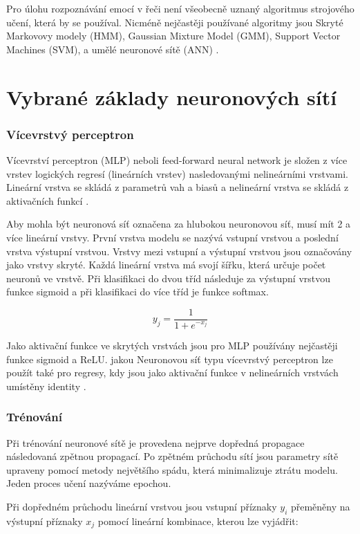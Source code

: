 \documentclass[FM,BP]{tulthesis}
\begin{document}
Pro úlohu rozpoznávání emocí v řeči není všeobecně uznaný algoritmus strojového učení, která by se používal. Nicméně nejčastěji používané algoritmy jsou Skryté Markovovy modely (HMM), Gaussian Mixture Model (GMM), Support Vector Machines (SVM), a umělé neuronové sítě (ANN) \cite{DBLP:journals/speech/AkcayO20}.

\chapter{Vybrané základy neuronových sítí}

\subsection{Vícevrstvý perceptron}
Vícevrství perceptron (MLP) neboli feed-forward neural network je složen z více vrstev logických regresí (lineárních vrstev) nasledovanými nelineárními vrstvami. Lineární vrstva se skládá z parametrů vah a biasů a nelineární vrstva se skládá z aktivačních funkcí \cite{DBLP:books/lib/Bishop07}.

Aby mohla být neuronová síť označena za hlubokou neuronovou síť, musí mít 2 a více lineární vrstvy. První vrstva modelu se nazývá vstupní vrstvou a poslední vrstva výstupní vrstvou. Vrstvy mezi vstupní a výstupní vrstvou jsou označovány jako vrstvy skryté. Každá lineární vrstva má svojí šířku, která určuje počet neuronů ve vrstvě. Při klasifikaci do dvou tříd následuje za výstupní vrstvou funkce sigmoid a při klasifikaci do více tříd je funkce softmax.

$$ y_j =  \frac{\mathrm{1} }{\mathrm{1} + e^{-x_j} }  $$ 

Jako aktivační funkce ve skrytých vrstvách jsou pro MLP používány nejčastěji funkce sigmoid a ReLU. jakou Neuronovou síť typu vícevrstvý perceptron lze použít také pro regresy, kdy jsou jako aktivační funkce v nelineárních vrstvách umístěny identity \cite{DBLP:books/lib/Bishop07}.

\subsection{Trénování}
Při trénování neuronové sítě je provedena nejprve dopředná propagace následovaná zpětnou propagací. Po zpětném průchodu sítí jsou parametry sítě upraveny pomocí metody největšího spádu, která minimalizuje ztrátu modelu. Jeden proces učení nazýváme epochou.

Při dopředném průchodu lineární vrstvou jsou vstupní příznaky $ y_i $ přeměněny na výstupní příznaky $ x_j $ pomocí lineární kombinace, kterou lze vyjádřit:
\end{document}
